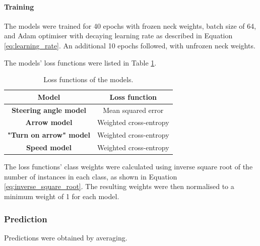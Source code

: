 \documentclass{article}
\begin{document}
\paragraph{Training}
The models were trained for 40 epochs with frozen neck weights, batch size of 64, and Adam optimiser with decaying learning rate as described in Equation \ref{eq:learning_rate}. An additional 10 epochs followed, with unfrozen neck weights. 

The models' loss functions were listed in Table \ref{tab:live_test_loss_functions}.

\begin{table}[H]
  \centering
  \begin{tabular}{|c|c|}
    \hline
    \textbf{Model} & \textbf{Loss function} \\ \hline
    \textbf{Steering angle model} & Mean squared error \\ \hline
    \textbf{Arrow model} & Weighted cross-entropy \\ \hline
    \textbf{"Turn on arrow" model} & Weighted cross-entropy \\ \hline
    \textbf{Speed model} & Weighted cross-entropy \\ \hline
  \end{tabular}
  \vspace{0.5em}
  \caption{Loss functions of the models.}
  \label{tab:live_test_loss_functions}
\end{table}

The loss functions' class weights were calculated using inverse square root of the number of instances in each class, as shown in Equation \ref{eq:inverse_square_root}. The resulting weights were then normalised to a minimum weight of 1 for each model.

\subsubsection{Prediction}
Predictions were obtained by averaging.
\end{document}
